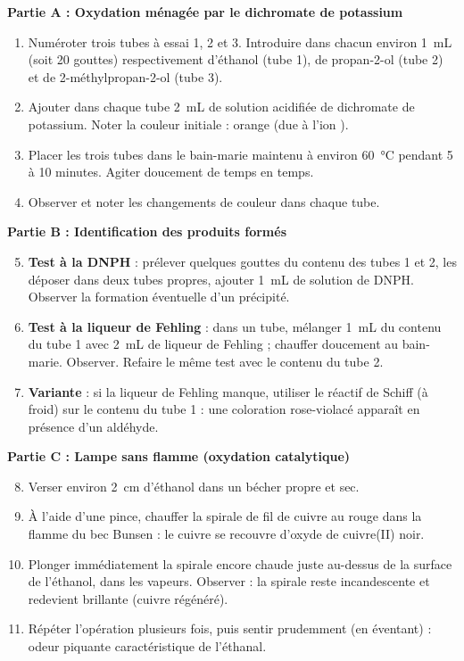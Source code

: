 \documentclass[11pt]{article}
\newcounter{popsec}
\newcounter{popsub}
\newcommand{\courssub}[1]{%
  \stepcounter{popsub}%
  \par\vspace{9pt}\noindent{\popxbold\fontsize{11.5}{13}\selectfont\color{popink}{\color{poporange}\thepopsec.\thepopsub}\hspace{6pt}#1}\par\nopagebreak\vspace{4pt}
}
\begin{document}
\courssub{Protocole}

\textbf{Partie A : Oxydation ménagée par le dichromate de potassium}

\begin{enumerate}
\item Numéroter trois tubes à essai 1, 2 et 3. Introduire dans chacun environ \SI{1}{mL} (soit 20 gouttes) respectivement d'éthanol (tube 1), de propan-2-ol (tube 2) et de 2-méthylpropan-2-ol (tube 3).
\item Ajouter dans chaque tube \SI{2}{mL} de solution acidifiée de dichromate de potassium. Noter la couleur initiale : orange (due à l'ion ).
\item Placer les trois tubes dans le bain-marie maintenu à environ \SI{60}{\celsius} pendant 5 à 10 minutes. Agiter doucement de temps en temps.
\item Observer et noter les changements de couleur dans chaque tube.
\end{enumerate}

\textbf{Partie B : Identification des produits formés}

\begin{enumerate}
\setcounter{enumi}{4}
\item \textbf{Test à la DNPH} : prélever quelques gouttes du contenu des tubes 1 et 2, les déposer dans deux tubes propres, ajouter \SI{1}{mL} de solution de DNPH. Observer la formation éventuelle d'un précipité.
\item \textbf{Test à la liqueur de Fehling} : dans un tube, mélanger \SI{1}{mL} du contenu du tube 1 avec \SI{2}{mL} de liqueur de Fehling ; chauffer doucement au bain-marie. Observer. Refaire le même test avec le contenu du tube 2.
\item \textbf{Variante} : si la liqueur de Fehling manque, utiliser le réactif de Schiff (à froid) sur le contenu du tube 1 : une coloration rose-violacé apparaît en présence d'un aldéhyde.
\end{enumerate}

\textbf{Partie C : Lampe sans flamme (oxydation catalytique)}

\begin{enumerate}
\setcounter{enumi}{7}
\item Verser environ \SI{2}{cm} d'éthanol dans un bécher propre et sec.
\item À l'aide d'une pince, chauffer la spirale de fil de cuivre au rouge dans la flamme du bec Bunsen : le cuivre se recouvre d'oxyde de cuivre(II)  noir.
\item Plonger immédiatement la spirale encore chaude juste au-dessus de la surface de l'éthanol, dans les vapeurs. Observer : la spirale reste incandescente et redevient brillante (cuivre régénéré).
\item Répéter l'opération plusieurs fois, puis sentir prudemment (en éventant) : odeur piquante caractéristique de l'éthanal.
\end{enumerate}
\end{document}
